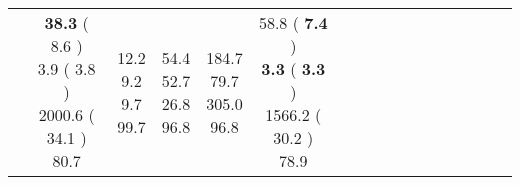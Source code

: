 \documentclass[9pt]{article}
\begin{document}
\begin{landscape}
\begin{longtable}{ l | c c c c | c c c c | c c c c | c c c c |}
 &
                    
                            \makecell{              \textbf{ 38.3 }
     (             8.6
    ) \\
            {\footnotesize             3.9
     (              3.8
     )} \\
            {\footnotesize             2000.6
     (            34.1
    ) } \\
            {\small  \textcolor[rgb]{ 0.586 , 0.313 , 0.1} {80.7  }
} }


             &
                            \makecell{              12.2
     \\
            {\footnotesize             9.2
    } \\  {\footnotesize             9.7
     } \\
            {\small \textcolor[rgb]{ 0.206 , 0.693 , 0.1} {99.7  }
} }
             &                         \makecell{              54.4
     \\
            {\footnotesize             52.7
    } \\  {\footnotesize             26.8
     } \\
            {\small \textcolor[rgb]{ 0.264 , 0.636 , 0.1} {96.8  }
} }
             &
                            \makecell{              184.7
     \\
            {\footnotesize             79.7
    } \\  {\footnotesize             305.0
     } \\
            {\small \textcolor[rgb]{ 0.264 , 0.636 , 0.1} {96.8  }
} }
            

 & 
                            \makecell{              58.8
     (             \textbf{ 7.4 }
    ) \\
            {\footnotesize             \textbf{ 3.3 }
     (              \textbf{ 3.3 }
     )} \\
            {\footnotesize             1566.2
     (            30.2
    ) } \\
            {\small  \textcolor[rgb]{ 0.622 , 0.278 , 0.1} {78.9  }
} }



\end{longtable}
\end{landscape}
\end{document}
